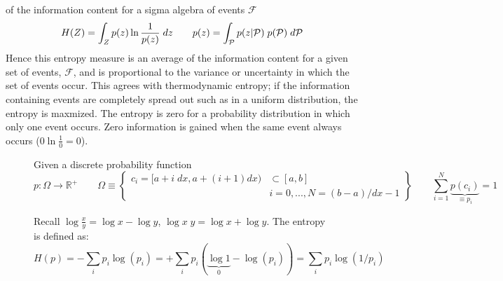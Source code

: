 \documentclass{article}         %
\theoremstyle{definition}
\theoremstyle{remark}
\newcommand{\picdir}{pdffig/}
\begin{document}
\begin{enumerate}
of the information content for a sigma algebra of events $\mathcal{F}$
\[
H(Z) = \int_Z  p(z) \ln\frac{1}{p(z)} \; dz
\qquad
  p(z) = \int_{\mathcal{P}} p(z|\mathcal{P}) \; p(\mathcal{P})\; d\mathcal{P} 
\]
Hence this entropy measure is an average of the information content
for a given set of events, $\mathcal{F}$, and is proportional to the
variance or uncertainty in which the set of events occur.
This agrees with thermodynamic entropy;
if the information containing events are completely spread out such as in a
uniform distribution, the entropy is maxmized.
The entropy
is zero for a probability distribution in which
only one event occurs. Zero information is gained when the same event
always occurs ($0 \ln\frac{1}{0} = 0$). 

\begin{figure}[h]
Given a discrete probability function 
\[
p: \Omega \rightarrow \mathbb{R}^+
\qquad
  \Omega \equiv
\left\{
\begin{split}
c_i
= 
[a+i \; dx , a + (i+1) dx ) & \subset [a,b]
\\
& i = 0,..., N =   (b-a)/dx -1
\end{split}
\right\}
\qquad
 \sum_{i=1}^N  \underbrace{p(c_i)}_{ \equiv p_i} = 1
\]
\begin{minipage}{.7\textwidth}
Recall $\log \frac{x}{y} = \log x - \log y$,
       $\log x\; y       = \log x + \log y$.
The entropy is defined as:
\[
H(p)=-\sum_i p_i \log(p_i)
    =+\sum_i p_i ( \underbrace{\log 1}_{0} -  \log(p_i) ) 
    = \sum_i p_i \log\left(1/p_i\right)
\]
\end{minipage}~\begin{minipage}{.29\textwidth}
\end{minipage}


\end{figure}
\end{enumerate}
\end{document}
